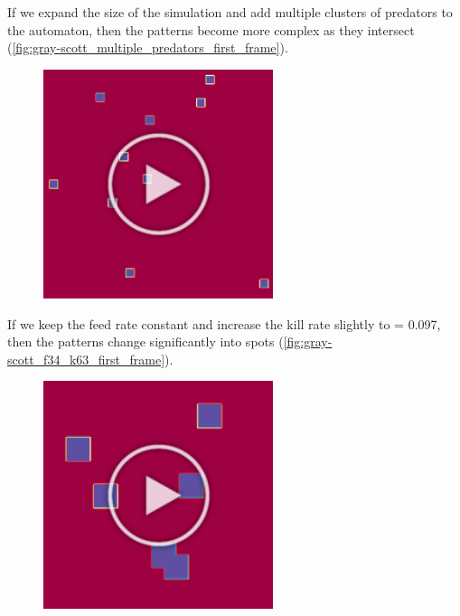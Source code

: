 If we expand the size of the simulation and add multiple clusters of predators to the automaton, then the patterns become more complex as they intersect (\autoref{fig:gray-scott_multiple_predators_first_frame}).\\

\begin{figure}[h]
\centering
\mySfFamily
\includegraphics[width = 0.6\textwidth]{../images/gray-scott_multiple_predators_first_frame.png}
\caption{}
\label{fig:gray-scott_multiple_predators_first_frame}
\end{figure}

If we keep the feed rate constant and increase the kill rate slightly to  = 0.097, then the patterns change significantly into spots (\autoref{fig:gray-scott_f34_k63_first_frame}).\\

\begin{figure}[h]
\centering
\mySfFamily
\includegraphics[width = 0.6\textwidth]{../images/gray-scott_f34_k63_first_frame.png}
\caption{}
\label{fig:gray-scott_f34_k63_first_frame}
\end{figure}

